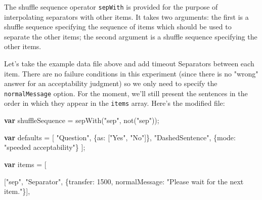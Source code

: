 \documentclass[
]{article}
\newenvironment{Shaded}{}{}
\newcommand{\DataTypeTok}[1]{\textcolor[rgb]{0.56,0.13,0.00}{#1}}
\newcommand{\DecValTok}[1]{\textcolor[rgb]{0.25,0.63,0.44}{#1}}
\newcommand{\FunctionTok}[1]{\textcolor[rgb]{0.02,0.16,0.49}{#1}}
\newcommand{\KeywordTok}[1]{\textcolor[rgb]{0.00,0.44,0.13}{\textbf{#1}}}
\newcommand{\NormalTok}[1]{#1}
\newcommand{\OperatorTok}[1]{\textcolor[rgb]{0.40,0.40,0.40}{#1}}
\newcommand{\StringTok}[1]{\textcolor[rgb]{0.25,0.44,0.63}{#1}}
\begin{document}
The shuffle sequence operator \texttt{sepWith} is provided for the
purpose of interpolating separators with other items. It takes two
arguments: the first is a shuffle sequence specifying the sequence of
items which should be used to separate the other items; the second
argument is a shuffle sequence specifying the other items.

Let's take the example data file above and add timeout Separators
between each item. There are no failure conditions in this experiment
(since there is no "wrong" answer for an acceptability judgment) so we
only need to specify the \texttt{normalMessage} option. For the moment,
we'll still present the sentences in the order in which they appear in
the \texttt{items} array. Here's the modified file:

\begin{Shaded}
\begin{Highlighting}[]
    \KeywordTok{var}\NormalTok{ shuffleSequence }\OperatorTok{=} \FunctionTok{sepWith}\NormalTok{(}\StringTok{"sep"}\OperatorTok{,} \FunctionTok{not}\NormalTok{(}\StringTok{"sep"}\NormalTok{))}\OperatorTok{;}

    \KeywordTok{var}\NormalTok{ defaults }\OperatorTok{=}\NormalTok{ [}
        \StringTok{"Question"}\OperatorTok{,}\NormalTok{ \{}\DataTypeTok{as}\OperatorTok{:}\NormalTok{ [}\StringTok{"Yes"}\OperatorTok{,} \StringTok{"No"}\NormalTok{]\}}\OperatorTok{,}
        \StringTok{"DashedSentence"}\OperatorTok{,}\NormalTok{ \{}\DataTypeTok{mode}\OperatorTok{:} \StringTok{"speeded acceptability"}\NormalTok{\}}
\NormalTok{    ]}\OperatorTok{;}

    \KeywordTok{var}\NormalTok{ items }\OperatorTok{=}\NormalTok{ [}

\NormalTok{    [}\StringTok{"sep"}\OperatorTok{,} \StringTok{"Separator"}\OperatorTok{,}\NormalTok{ \{}\DataTypeTok{transfer}\OperatorTok{:} \DecValTok{1500}\OperatorTok{,} \DataTypeTok{normalMessage}\OperatorTok{:} \StringTok{"Please wait for the next item."}\NormalTok{\}]}\OperatorTok{,}


\end{Highlighting}
\end{Shaded}
\end{document}
